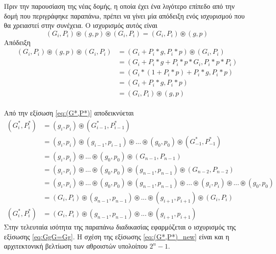 Πριν την παρουσίαση της νέας δομής, η οποία έχει ένα λιγότερο επίπεδο από την δομή 
που περιγράφηκε παραπάνω, πρέπει να γίνει μία απόδειξη ενός ισχυρισμού που θα χρειαστεί στην 
συνέχεια. Ο ισχυρισμός αυτός είναι
\begin{equation}
\label{eq:GgG=Gg}
    (G_i,P_i)\circledast(g,p)\circledast(G_i,P_i) = (G_i,P_i)\circledast(g,p)
\end{equation}
Απόδειξη
\begin{equation*}
    \begin{split}
        (G_i,P_i)\circledast(g,p)\circledast(G_i,P_i) &= (G_i + P_i*g,P_i*p) \circledast (G_i,P_i) \\
        &= (G_i + P_i*g + P_i*p*G_i , P_i*p*P_i)\\
        &= (G_i*(1 + P_i*p) + P_i*g , P_i*p )\\
        &= (G_i + P_i*g , P_i * p)\\
        &= (G_i,P_i) \circledast (g,p)
    \end{split}
\end{equation*}
\\
Από την εξίσωση \ref{eq:(G*,P*)} αποδεικνύεται 
\begin{equation}
\label{eq:(G*,P*)_new}
    \begin{split}
        (G^*_i,P^*_i) &= (g_i,p_i) \circledast (G^*_{i-1},P^*_{i-1})\\
        &= (g_i,p_i) \circledast (g_{i-1},p_{i-1}) \circledast ... \circledast (g_0,p_0) \circledast (G^*_{-1},P^*_{-1})\\
        &= (g_i,p_i) \circledast ... \circledast (g_0,p_0) \circledast (G_{n-1},P_{n-1})\\
        &= (g_i,p_i) \circledast ... \circledast (g_0,p_0) \circledast (g_{n-1},p_{n-1}) \circledast (G_{n-2},P_{n-2})\\
        &= (g_i,p_i) \circledast ... \circledast (g_0,p_0) \circledast (g_{n-1},p_{n-1})
        \circledast ... \circledast (g_i,p_i) \circledast ... \circledast (g_0,p_0)\\
        &= (G_i,P_i) \circledast (g_{n-1},p_{n-1}) \circledast ... \circledast (g_{i+1},p_{i+1})
        \circledast (G_i,P_i)\\
        (G^*_i,P^*_i) &= (G_i,P_i) \circledast (g_{n-1},p_{n-1}) \circledast ... \circledast (g_{i+1},p_{i+1})
    \end{split}
\end{equation}
Στην τελευταία ισότητα της παραπάνω διαδικασίας εφαρμόζεται ο ισχυρισμός της εξίσωσης \ref{eq:GgG=Gg}.
Η σχέση της εξίσωσης \ref{eq:(G*,P*)_new} είναι και η αρχιτεκτονική βελτίωση των αθροιστών υπολοίπου
$2^n-1$.

